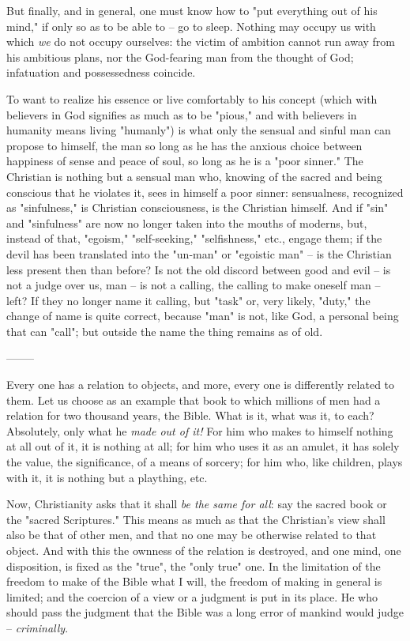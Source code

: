But finally, and in general, one must know how to "{}put everything out of his 
mind,"{} if only so as to be able to -- go to sleep. Nothing may occupy us 
with which \textit{we} do not occupy ourselves: the victim of ambition cannot 
run away from his ambitious plans, nor the God-fearing man from the thought of 
God; infatuation and possessedness coincide.

To want to realize his essence or live comfortably to his concept (which with 
believers in God signifies as much as to be "{}pious,"{} and with believers in 
humanity means living "{}humanly"{}) is what only the sensual and sinful man 
can propose to himself, the man so long as he has the anxious choice between 
happiness of sense and peace of soul, so long as he is a "{}poor sinner."{} 
The Christian is nothing but a sensual man who, knowing of the sacred and 
being conscious that he violates it, sees in himself a poor sinner: 
sensualness, recognized as "{}sinfulness,"{} is Christian consciousness, is 
the Christian himself. And if "{}sin"{} and "{}sinfulness"{} are now no longer 
taken into the mouths of moderns, but, instead of that, "{}egoism,"{} 
"{}self-seeking,"{} "{}selfishness,"{} etc., engage them; if the devil has 
been translated into the "{}un-man"{} or "{}egoistic man"{} -- is the 
Christian less present then than before? Is not the old discord between good 
and evil -- is not a judge over us, man -- is not a calling, the calling to 
make oneself man -- left? If they no longer name it calling, but "{}task"{} 
or, very likely, "{}duty,"{} the change of name is quite correct, because 
"{}man"{} is not, like God, a personal being that can "{}call"{}; but outside 
the name the thing remains as of old.

\begin{center}
--------\end{center}


Every one has a relation to objects, and more, every one is differently 
related to them. Let us choose as an example that book to which millions of 
men had a relation for two thousand years, the Bible. What is it, what was it, 
to each? Absolutely, only what he \textit{made out of it!} For him who makes 
to himself nothing at all out of it, it is nothing at all; for him who uses it 
as an amulet, it has solely the value, the significance, of a means of 
sorcery; for him who, like children, plays with it, it is nothing but a 
plaything, etc.

Now, Christianity asks that it shall \textit{be the same for all}: say the 
sacred book or the "{}sacred Scriptures."{} This means as much as that the 
Christian's view shall also be that of other men, and that no one may be 
otherwise related to that object. And with this the ownness of the relation is 
destroyed, and one mind, one disposition, is fixed as the "{}true"{}, the 
"{}only true"{} one. In the limitation of the freedom to make of the Bible 
what I will, the freedom of making in general is limited; and the coercion of 
a view or a judgment is put in its place. He who should pass the judgment that 
the Bible was a long error of mankind would judge -- \textit{criminally}.

